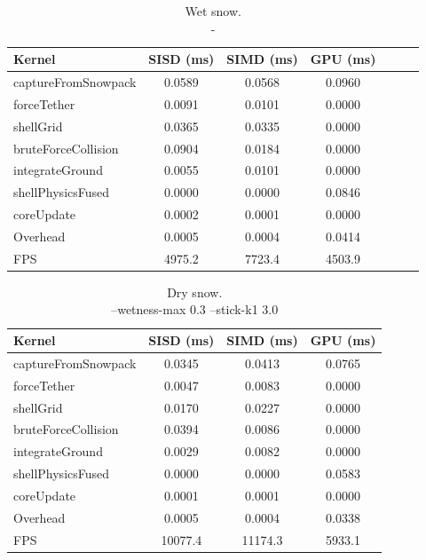 \begin{table}[H]
  \caption{Wet snow. \\-}
  \label{tab:gtx_scenario1_timing}
  \centering
  \scriptsize
  \begin{tabular}{@{}lcccccc@{}}
    \toprule
    \textbf{Kernel} & \textbf{SISD (ms)} & \textbf{SIMD (ms)} & \textbf{GPU (ms)} \\
    \midrule
    captureFromSnowpack           & 0.0589 & 0.0568 & 0.0960 \\
    forceTether                   & 0.0091 & 0.0101 & 0.0000 \\
    shellGrid                     & 0.0365 & 0.0335 & 0.0000 \\
    bruteForceCollision           & 0.0904 & 0.0184 & 0.0000 \\
    integrateGround               & 0.0055 & 0.0101 & 0.0000 \\
    shellPhysicsFused             & 0.0000 & 0.0000 & 0.0846 \\
    coreUpdate                    & 0.0002 & 0.0001 & 0.0000 \\
    Overhead                      & 0.0005 & 0.0004 & 0.0414 \\
    \bottomrule
    FPS                           & 4975.2 & 7723.4 & 4503.9
  \end{tabular}
\end{table}

\begin{table}[H]
  \caption{Dry snow.\\--wetness-max 0.3 --stick-k1 3.0}
  \label{tab:gtx_scenario2_timing}
  \centering
  \scriptsize
  \begin{tabular}{@{}lccc@{}}
    \toprule
    \textbf{Kernel} & \textbf{SISD (ms)} & \textbf{SIMD (ms)} & \textbf{GPU (ms)} \\
    \midrule
    captureFromSnowpack           & 0.0345 & 0.0413 & 0.0765 \\
    forceTether                   & 0.0047 & 0.0083 & 0.0000 \\
    shellGrid                     & 0.0170 & 0.0227 & 0.0000 \\
    bruteForceCollision           & 0.0394 & 0.0086 & 0.0000 \\
    integrateGround               & 0.0029 & 0.0082 & 0.0000 \\
    shellPhysicsFused             & 0.0000 & 0.0000 & 0.0583 \\
    coreUpdate                    & 0.0001 & 0.0001 & 0.0000 \\
    Overhead                      & 0.0005 & 0.0004 & 0.0338 \\
    \bottomrule
    FPS                           & 10077.4 & 11174.3 & 5933.1
  \end{tabular}
\end{table}

